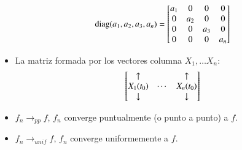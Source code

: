 \begin{multicols}{2}
\begin{itemize}
            $$ \diag(a_1, a_2, a_3, a_n) =
                \mx{
                    a_1 & 0  & 0  & 0  \\
                     0  &a_2 & 0  & 0  \\
                     0  & 0  & a_3& 0  \\
                     0  & 0  & 0  & a_n
                }
            $$
        \item La matriz formada por los vectores columna $X_1, \ldots X_n$:
        $$
        \mx{\uparrow && \uparrow\\ X_1(t_0) & \cdots & X_n(t_0) \\ \downarrow && \downarrow}
        $$
        \item $f_n \to_{pp} f$, $f_n$ converge puntualmente (o punto a punto) a $f$.
        \item $f_n \to_{unif} f$, $f_n$ converge uniformemente a $f$.
    \end{itemize}
\end{multicols}
